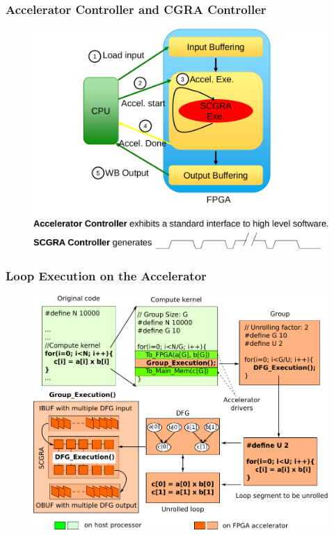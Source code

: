 \documentclass[accentcolor=tud1a,colorbacktitle,inverttitle,landscape,german,presentation,t]{tudbeamer}
\begin{document}
  \begin{frame}
  \frametitle{Accelerator Controller and CGRA Controller}
  \begin{figure}
    \includegraphics[width=.75\linewidth]{controller}
  \end{figure}
  \end{frame}

  \begin{frame}
  \frametitle{Loop Execution on the Accelerator}
  \begin{figure}
    \includegraphics[width=.75\linewidth]{dfg-gen}
  \end{figure}
  \end{frame}
\end{document}

